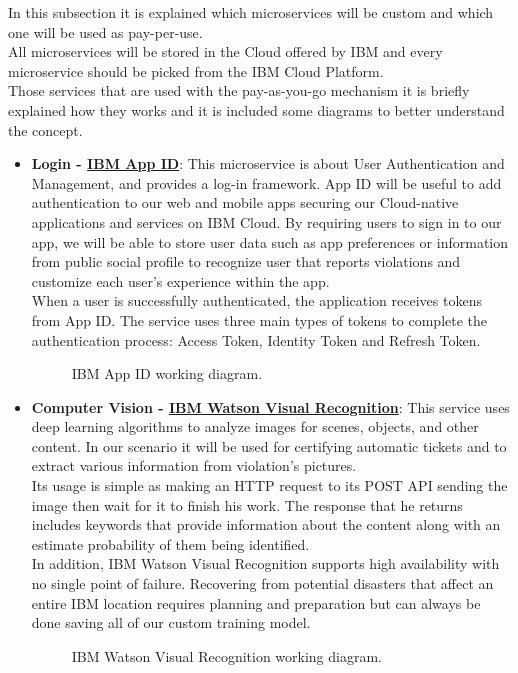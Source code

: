 In this subsection it is explained which microservices will be custom and which one will be used as pay-per-use. 
\\All microservices will be stored in the Cloud offered by IBM and every microservice should be picked from the IBM Cloud Platform.
\\Those services that are used with the pay-as-you-go mechanism it is briefly explained how they works and it is included some diagrams to better understand the concept.
\begin{itemize}
	\item \textbf{Login - \href{https://cloud.ibm.com/catalog/services/app-id}{IBM App ID}}: This microservice is about User Authentication and Management, and provides a log-in framework. App ID will be useful to add authentication to our web and mobile apps securing our Cloud-native applications and services on IBM Cloud. By requiring users to sign in to our app, we will be able to store user data such as app preferences or information from public social profile to recognize user that reports violations and customize each user's experience within the app.
	\\When a user is successfully authenticated, the application receives tokens from App ID. The service uses three main types of tokens to complete the authentication process: Access Token, Identity Token and Refresh Token.
	\begin{figure}[h!]
		\caption{IBM App ID working diagram.}
	\end{figure}
	\FloatBarrier

	\item \textbf{Computer Vision - \href{https://cloud.ibm.com/catalog/services/visual-recognition}{IBM Watson Visual Recognition}}: This service uses deep learning algorithms to analyze images for scenes, objects, and other content. In our scenario it will be used for certifying automatic tickets and to extract various information from violation's pictures.
	\\Its usage is simple as making an HTTP request to its POST API sending the image then wait for it to finish his work. The response that he returns includes keywords that provide information about the content along with an estimate probability of them being identified.
	\\In addition, IBM Watson Visual Recognition supports high availability with no single point of failure. Recovering from potential disasters that affect an entire IBM location requires planning and preparation but can always be done saving all of our custom training model.
	\begin{figure}[h!]
		\caption{IBM Watson Visual Recognition working diagram.}
	\end{figure}
	\FloatBarrier
	

\end{itemize}
